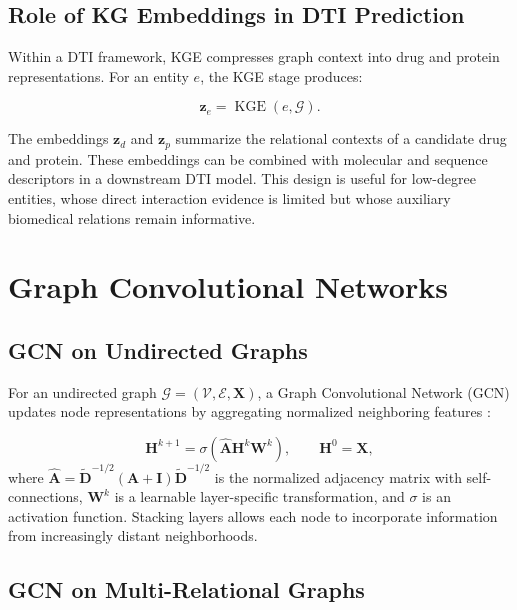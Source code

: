 \subsection{Role of KG Embeddings in DTI Prediction}

Within a DTI framework, KGE compresses graph context into drug and protein
representations. For an entity $e$, the KGE stage produces:

\begin{equation}
    \mathbf{z}_{e}
    =
    \operatorname{KGE}(e,\mathcal{G}).
\end{equation}

The embeddings $\mathbf{z}_{d}$ and $\mathbf{z}_{p}$ summarize the relational
contexts of a candidate drug and protein. These embeddings can be combined
with molecular and sequence descriptors in a downstream DTI model. This design
is useful for low-degree entities, whose direct interaction evidence is
limited but whose auxiliary biomedical relations remain informative.

\section{Graph Convolutional Networks}

\subsection{GCN on Undirected Graphs}

For an undirected graph $\mathcal{G}=(\mathcal{V},\mathcal{E},\mathbf{X})$, a
Graph Convolutional Network (GCN) updates node representations by aggregating
normalized neighboring features \cite{kipf2017semi}:

\begin{equation}
    \mathbf{H}^{k+1}
    =
    \sigma
    \left(
        \widehat{\mathbf{A}}\mathbf{H}^{k}\mathbf{W}^{k}
    \right),
    \qquad
    \mathbf{H}^{0}=\mathbf{X},
    \label{eq:background_gcn_update}
\end{equation}
where
$\widehat{\mathbf{A}}=\widetilde{\mathbf{D}}^{-1/2}
(\mathbf{A}+\mathbf{I})\widetilde{\mathbf{D}}^{-1/2}$ is the normalized
adjacency matrix with self-connections, $\mathbf{W}^{k}$ is a learnable
layer-specific transformation, and $\sigma$ is an activation function.
Stacking layers allows each node to incorporate information from increasingly
distant neighborhoods.

\subsection{GCN on Multi-Relational Graphs}

